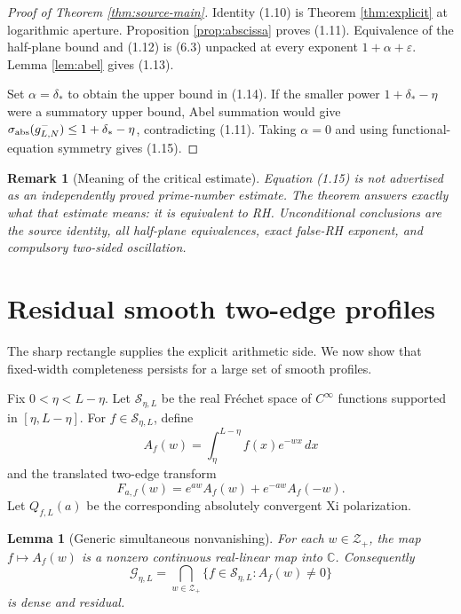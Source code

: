 \documentclass[11pt]{article}
\newtheorem{lemma}[theorem]{Lemma}
\newtheorem{remark}[theorem]{Remark}
\newcommand{\C}{\mathbb C}
\newcommand{\cZ}{\mathcal Z}
\newcommand{\cG}{\mathcal G}
\begin{document}
\begin{proof}[Proof of Theorem \ref{thm:source-main}]
Identity (1.10) is Theorem \ref{thm:explicit} at logarithmic aperture.  Proposition
\ref{prop:abscissa} proves (1.11).  Equivalence of the half-plane bound and (1.12) is (6.3)
unpacked at every exponent \(1+\alpha+\varepsilon\).  Lemma \ref{lem:abel} gives (1.13).

Set \(\alpha=\delta_*\) to obtain the upper bound in (1.14).  If the smaller power
\(1+\delta_*-\eta\) were a summatory upper bound, Abel summation would give
\(\sigma_{\rm abs}(g^-_{L,N})\le1+\delta_*-\eta\), contradicting (1.11).  Taking
\(\alpha=0\) and using functional-equation symmetry gives (1.15).
\end{proof}

\begin{remark}[Meaning of the critical estimate]
Equation (1.15) is not advertised as an independently proved prime-number estimate.  The theorem
answers exactly what that estimate means: it is equivalent to RH.  Unconditional conclusions are
the source identity, all half-plane equivalences, exact false-RH exponent, and compulsory
two-sided oscillation.
\end{remark}

\section{Residual smooth two-edge profiles}\label{sec:smooth}

The sharp rectangle supplies the explicit arithmetic side.  We now show that fixed-width
completeness persists for a large set of smooth profiles.

Fix \(0<\eta<L-\eta\).  Let \(\mathcal S_{\eta,L}\) be the real Fr\'echet space of
\(C^\infty\) functions supported in \([\eta,L-\eta]\).  For \(f\in\mathcal S_{\eta,L}\), define
\[
 A_f(w)=\int_{\eta}^{L-\eta}f(x)e^{-wx}\,dx
\tag{7.1}
\]
and the translated two-edge transform
\[
 F_{a,f}(w)=e^{aw}A_f(w)+e^{-aw}A_f(-w).
\tag{7.2}
\]
Let \(Q_{f,L}(a)\) be the corresponding absolutely convergent Xi polarization.

\begin{lemma}[Generic simultaneous nonvanishing]\label{lem:generic}
For each \(w\in\cZ_+\), the map \(f\mapsto A_f(w)\) is a nonzero continuous real-linear map
into \(\C\).  Consequently
\[
 \cG_{\eta,L}=
 \bigcap_{w\in\cZ_+}\{f\in\mathcal S_{\eta,L}:A_f(w)\ne0\}
\tag{7.3}
\]
is dense and residual.
\end{lemma}
\end{document}
